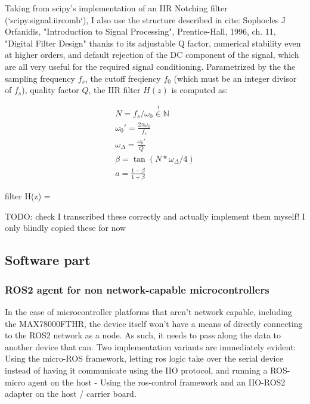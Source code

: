 \documentclass{thesis}
\newcommand{\todo}[1]{{\color{red}TODO: #1}}
\begin{document}
{Taking from scipy's implementation of an IIR Notching filter (`scipy.signal.iircomb`), I also use the structure described in {cite: Sophocles J Orfanidis, "Introduction to Signal Processing", Prentice-Hall, 1996, ch. 11, "Digital Filter Design"} thanks to its adjustable Q factor, numerical stability even at higher orders, and default rejection of the DC component of the signal, which are all very useful for the required signal conditioning. Parametrized by the the sampling frequency $f_s$, the cutoff freqiency $f_0$ (which must be an integer divisor of $f_s$), quality factor $Q$, the IIR filter $H(z)$ is computed as:

\begin{gather*}
N = f_s / \omega_0 \overset{!}{\in} \mathbb{N} \\
\omega_0' = \frac{2\pi\omega_0}{f_s}  \\
\omega_\Delta = \frac{\omega_0'}{Q}  \\
\beta = \tan(N * \omega_\Delta / 4)  \\
a = \frac{1 - \beta}{1 + \beta}
\end{gather*}
\begin{thesisequation}{filter}
H(z) =  \cdot {}
\end{thesisequation}

\todo{check I transcribed these correctly and actually implement them myself! I only blindly copied these for now}

\newpage
\subsection{Software part}

\subsubsection{ROS2 agent for non network-capable microcontrollers}

In the case of microcontroller platforms that aren't network capable, including the MAX78000FTHR, the device itself won't have a means of directly connecting to the ROS2 network as a node. As such, it needs to pass along the data to another device that can. Two implementation variants are immediately evident: Using the micro-ROS framework, letting ros logic take over the serial device instead of having it communicate using the IIO protocol, and running a ROS-micro agent on the host
- Using the ros-control framework and an IIO-ROS2 adapter on the host / carrier board.

}
\end{document}
